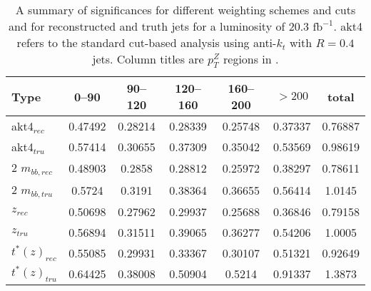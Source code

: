 \begin{table}[!htbp]\captionsetup{justification=centering}
\caption{A summary of significances for different weighting schemes and cuts and for reconstructed and truth jets for a luminosity of $20.3\text{ fb}^{-1}.$  akt4 refers to the standard cut-based analysis using anti-$k_t$ with $R=0.4$ jets.  Column titles are $p_T^Z$ regions in \GeV.\label{tab:SdB}}
\begin{center}
\begin{tabular}{|l|c|c|c|c|c|c|}
\hline
Type                       & 0--90 & 90--120 & 120--160 & 160--200 & $>200$ & total\\
\hline
akt4$_{rec}$  &    0.47492  &    0.28214    &    0.28339     &    0.25748     &    0.37337   &    0.76887\\
akt4$_{tru}$  &    0.57414  &    0.30655    &    0.37309     &    0.35042     &    0.53569   &    0.98619\\
\hline
2 $m_{bb,rec}$             &    0.48903  &     0.2858    &    0.28812     &    0.25972     &    0.38297   &    0.78611\\
2 $m_{bb,tru}$             &     0.5724  &     0.3191    &    0.38364     &    0.36655     &    0.56414   &     1.0145\\
\hline
$z_{rec}$                  &    0.50698  &    0.27962    &    0.29937     &    0.25688     &    0.36846   &    0.79158\\
$z_{tru}$                  &    0.56894  &    0.31511    &    0.39065     &    0.36277     &    0.54206   &     1.0005\\
\hline
$t^*\left(z\right)_{rec}$  &    0.55085 &    0.29931     &    0.33367     &    0.30107     &    0.51321   &    0.92649\\
$t^*\left(z\right)_{tru}$  &    0.64425 &    0.38008     &    0.50904     &     0.5214     &    0.91337   &     1.3873\\
\hline
\end{tabular}
\end{center}
\end{table}

\clearpage
